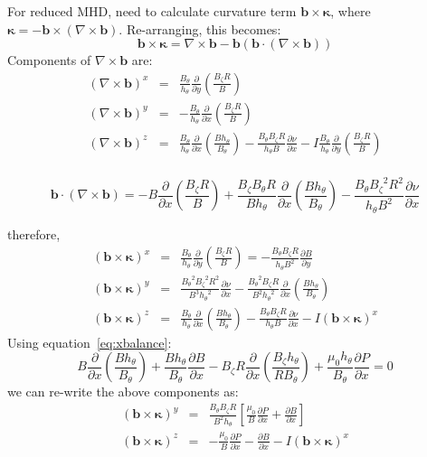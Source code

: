 \documentclass[12pt, a4paper]{article}
\newcommand{\deriv}[2]{\ensuremath{\frac{\partial #1}{\partial #2}}}
\newcommand{\hthe}{\ensuremath{h_\theta}}
\newcommand{\Bp}{\ensuremath{B_\theta}}
\newcommand{\Bt}{\ensuremath{B_\zeta}}
\begin{document}
For reduced MHD, need to calculate curvature term $\mathbf{b}\times\mathbf{\kappa}$, where
$\mathbf{\kappa} = -\mathbf{b}\times\left(\nabla\times\mathbf{b}\right)$. Re-arranging, this becomes:
\[
\mathbf{b}\times\mathbf{\kappa} = \nabla\times\mathbf{b} - \mathbf{b}\left(\mathbf{b}\cdot\left(\nabla\times\mathbf{b}\right)\right)
\]
Components of $\nabla\times\mathbf{b}$ are:
\begin{eqnarray*}
\left(\nabla\times\mathbf{b}\right)^x &=& \frac{\Bp}{\hthe}\deriv{}{y}\left(\frac{\Bt R}{B}\right) \\
\left(\nabla\times\mathbf{b}\right)^y &=& -\frac{\Bp}{\hthe}\deriv{}{x}\left(\frac{\Bt R}{B}\right) \\
\left(\nabla\times\mathbf{b}\right)^z &=& \frac{\Bp}{\hthe}\deriv{}{x}\left(\frac{B\hthe}{\Bp}\right) - \frac{\Bp\Bt R}{\hthe B}\deriv{\nu}{x} - I\frac{\Bp}{\hthe}\deriv{}{y}\left(\frac{\Bt R}{B}\right) \\
\end{eqnarray*}

\[
\mathbf{b}\cdot\left(\nabla\times\mathbf{b}\right) = -B\deriv{}{x}\left(\frac{\Bt R}{B}\right) + \frac{\Bt\Bp R}{B\hthe}\deriv{}{x}\left(\frac{B\hthe}{\Bp}\right) - \frac{\Bp\Bt^2R^2}{\hthe B^2}\deriv{\nu}{x}
\]

therefore,
\begin{eqnarray*}
\left(\mathbf{b}\times\mathbf{\kappa}\right)^x &=& \frac{\Bp}{\hthe}\deriv{}{y}\left(\frac{\Bt R}{B}\right) = -\frac{\Bp\Bt R}{\hthe B^2}\deriv{B}{y} \\
\left(\mathbf{b}\times\mathbf{\kappa}\right)^y &=& \frac{\Bp^2\Bt^2 R^2}{B^3\hthe^2}\deriv{\nu}{x} - \frac{\Bp^2\Bt R}{B^2\hthe^2}\deriv{}{x}\left(\frac{B\hthe}{\Bp}\right) \\
\left(\mathbf{b}\times\mathbf{\kappa}\right)^z &=& \frac{\Bp}{\hthe}\deriv{}{x}\left(\frac{B\hthe}{\Bp}\right) - \frac{\Bp\Bt R}{\hthe B}\deriv{\nu}{x} - I\left(\mathbf{b}\times\mathbf{\kappa}\right)^x
\end{eqnarray*}
Using equation~\ref{eq:xbalance}:
\[
B\deriv{}{x}\left(\frac{B\hthe}{\Bp}\right) + \frac{B\hthe}{\Bp}\deriv{B}{x} - \Bt R\deriv{}{x}\left(\frac{\Bt\hthe}{R\Bp}\right) + \frac{\mu_0\hthe}{\Bp}\deriv{P}{x} = 0
\]
we can re-write the above components as:
\begin{eqnarray*}
\left(\mathbf{b}\times\mathbf{\kappa}\right)^y &=& \frac{\Bp\Bt R}{B^2\hthe}\left[\frac{\mu_0}{B}\deriv{P}{x} + \deriv{B}{x}\right] \\
\left(\mathbf{b}\times\mathbf{\kappa}\right)^z &=& -\frac{\mu_0}{B}\deriv{P}{x} - \deriv{B}{x} - I\left(\mathbf{b}\times\mathbf{\kappa}\right)^x
\end{eqnarray*}
\end{document}
